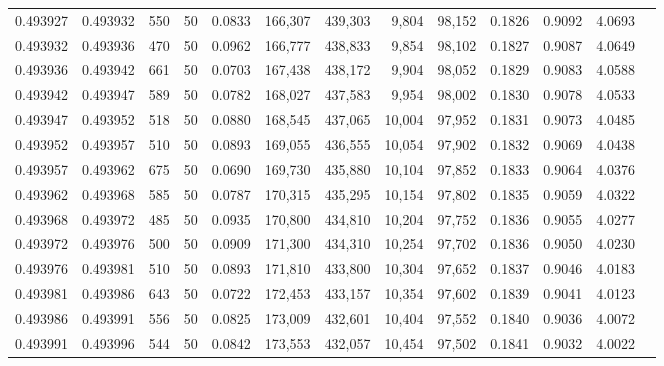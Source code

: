 \begin{tabular}{rrrrrrrrrrrrr}
0.493927 & 0.493932 &   550 &  50 &                                     0.0833 & 166,307 & 439,303 &   9,804 &  98,152 & 0.1826 & 0.9092 & 4.0693 \\
0.493932 & 0.493936 &   470 &  50 &                                     0.0962 & 166,777 & 438,833 &   9,854 &  98,102 & 0.1827 & 0.9087 & 4.0649 \\
0.493936 & 0.493942 &   661 &  50 &                                     0.0703 & 167,438 & 438,172 &   9,904 &  98,052 & 0.1829 & 0.9083 & 4.0588 \\
0.493942 & 0.493947 &   589 &  50 &                                     0.0782 & 168,027 & 437,583 &   9,954 &  98,002 & 0.1830 & 0.9078 & 4.0533 \\
0.493947 & 0.493952 &   518 &  50 &                                     0.0880 & 168,545 & 437,065 &  10,004 &  97,952 & 0.1831 & 0.9073 & 4.0485 \\
0.493952 & 0.493957 &   510 &  50 &                                     0.0893 & 169,055 & 436,555 &  10,054 &  97,902 & 0.1832 & 0.9069 & 4.0438 \\
0.493957 & 0.493962 &   675 &  50 &                                     0.0690 & 169,730 & 435,880 &  10,104 &  97,852 & 0.1833 & 0.9064 & 4.0376 \\
0.493962 & 0.493968 &   585 &  50 &                                     0.0787 & 170,315 & 435,295 &  10,154 &  97,802 & 0.1835 & 0.9059 & 4.0322 \\
0.493968 & 0.493972 &   485 &  50 &                                     0.0935 & 170,800 & 434,810 &  10,204 &  97,752 & 0.1836 & 0.9055 & 4.0277 \\
0.493972 & 0.493976 &   500 &  50 &                                     0.0909 & 171,300 & 434,310 &  10,254 &  97,702 & 0.1836 & 0.9050 & 4.0230 \\
0.493976 & 0.493981 &   510 &  50 &                                     0.0893 & 171,810 & 433,800 &  10,304 &  97,652 & 0.1837 & 0.9046 & 4.0183 \\
0.493981 & 0.493986 &   643 &  50 &                                     0.0722 & 172,453 & 433,157 &  10,354 &  97,602 & 0.1839 & 0.9041 & 4.0123 \\
0.493986 & 0.493991 &   556 &  50 &                                     0.0825 & 173,009 & 432,601 &  10,404 &  97,552 & 0.1840 & 0.9036 & 4.0072 \\
0.493991 & 0.493996 &   544 &  50 &                                     0.0842 & 173,553 & 432,057 &  10,454 &  97,502 & 0.1841 & 0.9032 & 4.0022 \\

\end{tabular}
